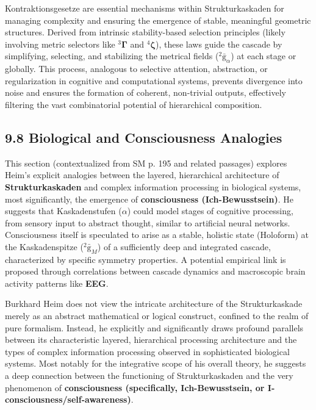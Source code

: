 \documentclass[12pt]{article}
\newcommand{\kompositionsfeld}{{}^2\bar{\mathrm{g}}}
\newcommand{\fundamentalkondensor}{{}^3\bm{\Gamma}}
\newcommand{\kaskadenstufe}{\alpha}
\newcommand{\strukturkompressor}{{}^4\bm{\zeta}}
\begin{document}
Kontraktionsgesetze are essential mechanisms within Strukturkaskaden for managing complexity and ensuring the emergence of stable, meaningful geometric structures. Derived from intrinsic stability-based selection principles (likely involving metric selectors like \(\fundamentalkondensor\) and \(\strukturkompressor\)), these laws guide the cascade by simplifying, selecting, and stabilizing the metrical fields (\(\kompositionsfeld_\alpha\)) at each stage or globally. This process, analogous to selective attention, abstraction, or regularization in cognitive and computational systems, prevents divergence into noise and ensures the formation of coherent, non-trivial outputs, effectively filtering the vast combinatorial potential of hierarchical composition.

\subsection{9.8 Biological and Consciousness Analogies}
\label{sec:cascade_cognition}

This section (contextualized from SM p. 195 and related passages) explores Heim's explicit analogies between the layered, hierarchical architecture of \textbf{Strukturkaskaden} and complex information processing in biological systems, most significantly, the emergence of \textbf{consciousness (Ich-Bewusstsein)}. He suggests that Kaskadenstufen (\(\kaskadenstufe\)) could model stages of cognitive processing, from sensory input to abstract thought, similar to artificial neural networks. Consciousness itself is speculated to arise as a stable, holistic state (Holoform) at the Kaskadenspitze (\(\kompositionsfeld_M\)) of a sufficiently deep and integrated cascade, characterized by specific symmetry properties. A potential empirical link is proposed through correlations between cascade dynamics and macroscopic brain activity patterns like \textbf{EEG}.

Burkhard Heim does not view the intricate architecture of the Strukturkaskade merely as an abstract mathematical or logical construct, confined to the realm of pure formalism. Instead, he explicitly and significantly draws profound parallels between its characteristic layered, hierarchical processing architecture and the types of complex information processing observed in sophisticated biological systems. Most notably for the integrative scope of his overall theory, he suggests a deep connection between the functioning of Strukturkaskaden and the very phenomenon of \textbf{consciousness (specifically, Ich-Bewusstsein, or I-consciousness/self-awareness)}.
\end{document}

